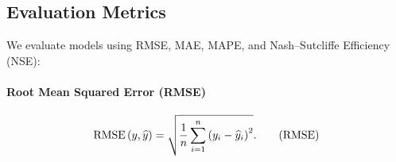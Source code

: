 




\subsection{Evaluation Metrics}

We evaluate models using RMSE, MAE, MAPE, and Nash–Sutcliffe Efficiency (NSE):

\paragraph{Root Mean Squared Error (RMSE)}
\begin{equation}
    \operatorname{RMSE}{\left(y, \widehat{y}\right)} = \sqrt{\frac{1}{n} \sum_{i=1}^{n} \left(y_i - \widehat{y}_i\right)^2}.
    \label{metric:rmse}
    \tag{RMSE}
\end{equation}

